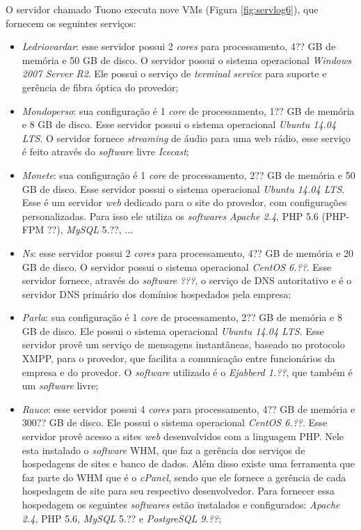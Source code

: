 O servidor chamado Tuono executa nove \ac{VM}s (Figura \ref{fig:servlog6}), que fornecem os seguintes serviços:
\begin{itemize}
 \item \textit{Ledriovardar}: esse servidor possui 2 \textit{cores} para processamento, 4?? GB de memória e 50 GB de disco. O servidor possui 
 o sistema operacional \textit{Windows 2007 Server R2}. Ele possui o serviço de \textit{terminal service} para suporte e gerência de fibra 
 óptica do provedor;
 
 \item \textit{Mondoperso}: sua configuração é 1 \textit{core} de processamento, 1?? GB de memória e 8 GB de disco. Esse servidor possui o 
 sistema operacional \textit{Ubuntu 14.04 \ac{LTS}}. O servidor fornece \textit{streaming} de áudio para uma web rádio, esse serviço é feito
 através do \textit{software} livre \textit{Icecast};
 
 \item \textit{Monete}: sua configuração é 1 \textit{core} de processamento, 2?? GB de memória e 50 GB de disco. Esse servidor possui o 
 sistema operacional \textit{Ubuntu 14.04 \ac{LTS}}. Esse é um servidor \textit{web} dedicado para o site do provedor, com configurações
 personalizadas. Para isso ele utiliza os \textit{softwares} \textit{Apache 2.4}, \ac{PHP} 5.6 (PHP-FPM ??), \textit{MySQL} 5.??, ...
 
 \item \textit{Ns}: esse servidor possui 2 \textit{cores} para processamento, 4?? GB de memória e 20 GB de disco. O servidor possui 
 o sistema operacional \textit{CentOS 6.??}. Esse servidor fornece, através do \textit{software} \textit{???}, o serviço de \ac{DNS} autoritativo 
 e é o servidor \ac{DNS} primário dos domínios hospedados pela empresa;
 
 \item \textit{Parla}: sua configuração é 1 \textit{core} de processamento, 2?? GB de memória e 8 GB de disco. Ele possui o sistema
 operacional \textit{Ubuntu 14.04 \ac{LTS}}. Esse servidor provê um serviço de mensagens instantâneas, baseado no protocolo \ac{XMPP}, para
 o provedor, que facilita a comunicação entre funcionários da empresa e do provedor. O \textit{software} utilizado é o \textit{Ejabberd 1.??},
 que também é um \textit{software} livre;
 
 \item \textit{Rauco}: esse servidor possui 4 \textit{cores} para processamento, 4?? GB de memória e 300?? GB de disco. Ele possui o sistema
 operacional \textit{CentOS 6.??}. Esse servidor provê acesso a sites \textit{web} desenvolvidos com a linguagem \ac{PHP}. Nele esta instalado o 
 \textit{software} \ac{WHM}, que faz a gerência dos serviços de hospedagens de sites e banco de dados. Além disso existe uma ferramenta que 
 faz parte do \ac{WHM} que é o \textit{cPanel}, sendo que ele fornece a gerência de cada hospedagem de site para seu respectivo desenvolvedor.
 Para fornecer essa hospedagem os seguintes \textit{softwares} estão instalados e configurados: \textit{Apache 2.4}, \ac{PHP} 5.6, 
 \textit{MySQL} 5.?? e \textit{PostgreSQL 9.??};
 

\end{itemize}
